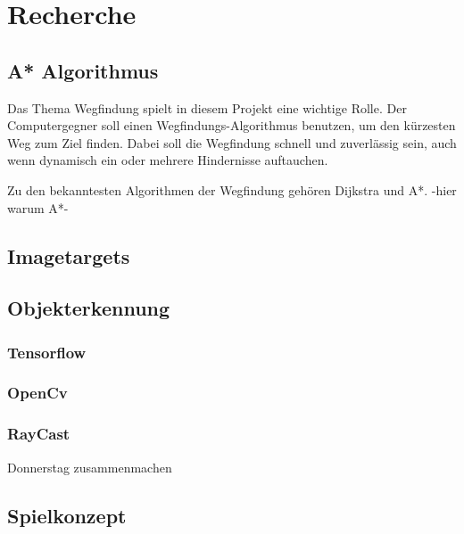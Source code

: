 \chapter{Recherche}
\label{sec:recherche}


\section{A* Algorithmus}
Das Thema Wegfindung spielt in diesem Projekt eine wichtige Rolle. Der Computergegner soll einen Wegfindungs-Algorithmus benutzen, um den kürzesten Weg zum Ziel finden. Dabei soll die Wegfindung schnell und zuverlässig sein, auch wenn dynamisch ein oder mehrere Hindernisse auftauchen.

Zu den bekanntesten Algorithmen der Wegfindung gehören Dijkstra und A*.
-hier warum A*-
\section{Imagetargets}
\section{Objekterkennung}
\subsection{Tensorflow}
\subsection{OpenCv}
\subsection{RayCast}

Donnerstag zusammenmachen
\section{Spielkonzept}
